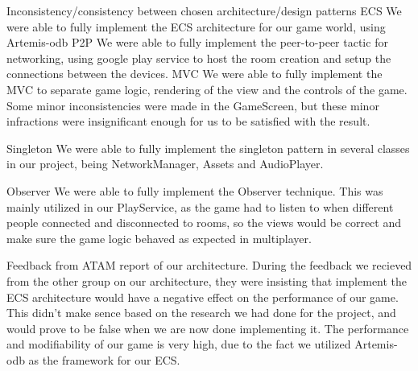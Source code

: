 
Inconsistency/consistency between chosen architecture/design patterns
ECS
We were able to fully implement the ECS architecture for our game world, using Artemis-odb
P2P
We were able to fully implement the peer-to-peer tactic for networking, using google play service to host the room creation and setup the connections between the devices.
MVC
We were able to fully implement the MVC to separate game logic, rendering of the view and the controls of the game. Some minor inconsistencies were made in the GameScreen, but these minor infractions were insignificant enough for us to be satisfied with the result.

Singleton
We were able to fully implement the singleton pattern in several classes in our project, being NetworkManager, Assets and AudioPlayer.


Observer
We were able to fully implement the Observer technique. This was mainly utilized in our PlayService, as the game had to listen to when different people connected and disconnected to rooms, so the views would be correct and make sure the game logic behaved as expected in multiplayer.


Feedback from ATAM report of our architecture.
During the feedback we recieved from the other group on our architecture, they were insisting that implement the ECS architecture would have a negative effect on the performance of our game. This didn’t make sence based on the research we had done for the project, and would prove to be false when we are now done implementing it. The performance and modifiability of our game is very high, due to the fact we utilized Artemis-odb as the framework for our ECS.

